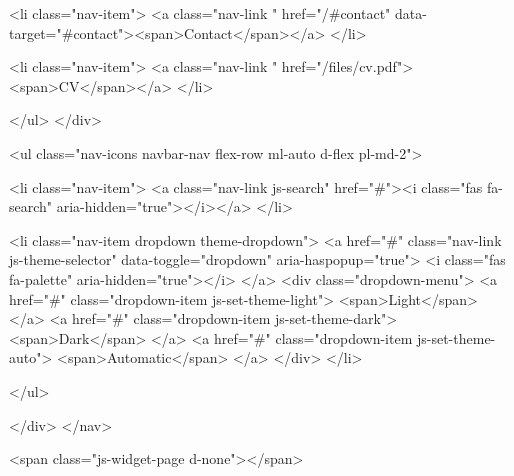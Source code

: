         <li class="nav-item">
          <a class="nav-link " href="/#contact" data-target="#contact"><span>Contact</span></a>
        </li>



















        <li class="nav-item">
          <a class="nav-link " href="/files/cv.pdf"><span>CV</span></a>
        </li>







      </ul>
    </div>

    <ul class="nav-icons navbar-nav flex-row ml-auto d-flex pl-md-2">

      <li class="nav-item">
        <a class="nav-link js-search" href="#"><i class="fas fa-search" aria-hidden="true"></i></a>
      </li>



      <li class="nav-item dropdown theme-dropdown">
        <a href="#" class="nav-link js-theme-selector" data-toggle="dropdown" aria-haspopup="true">
          <i class="fas fa-palette" aria-hidden="true"></i>
        </a>
        <div class="dropdown-menu">
          <a href="#" class="dropdown-item js-set-theme-light">
            <span>Light</span>
          </a>
          <a href="#" class="dropdown-item js-set-theme-dark">
            <span>Dark</span>
          </a>
          <a href="#" class="dropdown-item js-set-theme-auto">
            <span>Automatic</span>
          </a>
        </div>
      </li>




    </ul>

  </div>
</nav>












<span class="js-widget-page d-none"></span>












































